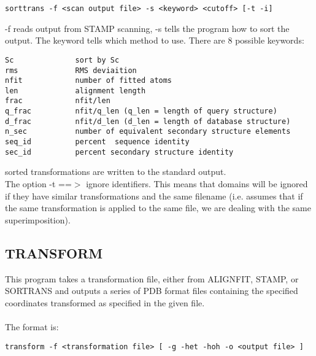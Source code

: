 \begin{scriptsize}\begin{verbatim}
sorttrans -f <scan output file> -s <keyword> <cutoff> [-t -i]
\end{verbatim} \end{scriptsize}

-f reads output from STAMP scanning, -s tells the program how to 
sort the output.  The keyword tells which method to use.  There
are 8 possible keywords:\\

\begin{scriptsize}\begin{verbatim}
Sc              sort by Sc
rms             RMS deviaition
nfit            number of fitted atoms
len             alignment length
frac            nfit/len
q_frac          nfit/q_len (q_len = length of query structure)
d_frac          nfit/d_len (d_len = length of database structure)
n_sec           number of equivalent secondary structure elements
seq_id          percent  sequence identity
sec_id          percent secondary structure identity
\end{verbatim} \end{scriptsize}

sorted transformations are written to the standard output.
\\
The option -t ==$>$ ignore identifiers.  This means that domains will be 
ignored if they have similar transformations and the same filename (i.e.
assumes that  if the same transformation is applied to the same
file, we are dealing with the same superimposition).

\subsection{TRANSFORM}

This program takes a transformation file, either from ALIGNFIT,
STAMP, or SORTRANS and outputs a series of PDB format files
containing the specified coordinates transformed as specified in
the given file.\\
\\
The format is:\\

\begin{scriptsize}\begin{verbatim}
transform -f <transformation file> [ -g -het -hoh -o <output file> ]
\end{verbatim} \end{scriptsize}

